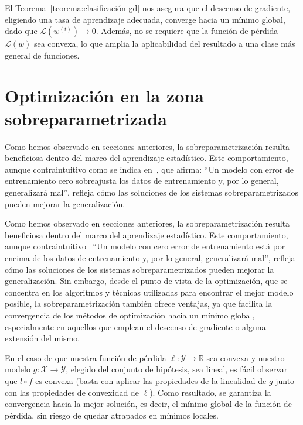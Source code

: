 El Teorema~\ref{teorema:clasificación-gd} nos asegura que el descenso de gradiente, eligiendo una tasa de aprendizaje adecuada, converge hacia un mínimo global, dado que $\mathcal{L}(w^{(t)}) \to 0$. Además, no se requiere que la función de pérdida $\mathcal{L}(w)$ sea convexa, lo que amplia la aplicabilidad del resultado a una clase más general de funciones.\newline

\section{Optimización en la zona sobreparametrizada}\label{sec:optimizacion-zona-sobreparametrizada}

Como hemos observado en secciones anteriores, la sobreparametrización resulta beneficiosa dentro del marco del aprendizaje estadístico. Este comportamiento, aunque contraintuitivo como se indica en~\cite{Hastie2001}, que afirma: ``Un modelo con error de entrenamiento cero sobreajusta los datos de entrenamiento y, por lo general, generalizará mal'', refleja cómo las soluciones de los sistemas sobreparametrizados pueden mejorar la generalización.\newline

Como hemos observado en secciones anteriores, la sobreparametrización resulta beneficiosa dentro del marco del aprendizaje estadístico. Este comportamiento, aunque contraintuitivo~\cite{Hastie2001} ``Un modelo con cero error de entrenamiento está por encima de los datos de entrenamiento y, por lo general, generalizará mal'', refleja cómo las soluciones de los sistemas sobreparametrizados pueden mejorar la generalización. Sin embargo, desde el punto de vista de la optimización, que se concentra en los algoritmos y técnicas utilizadas para encontrar el mejor modelo posible, la sobreparametrización también ofrece ventajas, ya que facilita la convergencia de los métodos de optimización hacia un mínimo global, especialmente en aquellos que emplean el descenso de gradiente o alguna extensión del mismo.\newline

En el caso de que nuestra función de pérdida $\ell: \mathcal{Y} \to \mathbb{R}$ sea convexa y nuestro modelo $g: \mathcal{X} \to \mathcal{Y}$, elegido del conjunto de hipótesis, sea lineal, es fácil observar que $l \circ f$ es convexa (basta con aplicar las propiedades de la linealidad de $g$ junto con las propiedades de convexidad de $\ell$). Como resultado, se garantiza la convergencia hacia la mejor solución, es decir, el mínimo global de la función de pérdida, sin riesgo de quedar atrapados en mínimos locales.\newline


